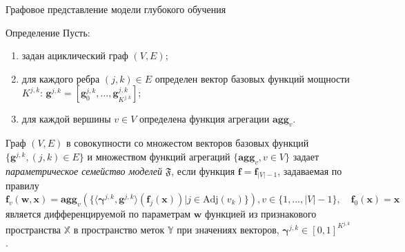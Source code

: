 \documentclass[usenames,dvipsnames,11pt,pdf,utf8,russian,aspectratio=43]{beamer}
\begin{document}
\begin{frame}{Графовое представление модели глубокого обучения}
\footnotesize
\begin{block}{Определение}
Пусть:
\begin{enumerate}
\item задан ациклический граф $(V,E)$;
\item для каждого ребра $(j,k) \in E$ определен вектор базовых функций  мощности $K^{j,k}$: $\mathbf{g}^{j,k} = [\mathbf{g}^{j,k}_0, \dots, \mathbf{g}^{j,k}_{K^{j,k}}]$;
\item для каждой вершины $v \in V$ определена функция агрегации $\textbf{agg}_v$.
\end{enumerate}
Граф $(V, E)$ в совокупности со множестом векторов базовых функций $\{\mathbf{g}^{j,k}, (j,k) \in E\}$ и множеством функций агрегаций $\{ \textbf{agg}_v, {v \in V}\}$ задает \textit{параметрическое семейство моделей} $\mathfrak{F}$, если функция $\mathbf{f} = \mathbf{f}_{|V|-1}$, задаваемая по правилу 
\begin{equation}
\label{eq:modelfam}
    \mathbf{f}_{v}(\mathbf{w}, \mathbf{x}) = \textbf{agg}_{v}\left(\{ \langle \boldsymbol{\gamma}^{j,k}, \mathbf{g}^{j,k} \rangle \left(\mathbf{f}_j(\mathbf{x})\right)| j \in \text{Adj}(v_k)\}\right), v \in \{1,\dots,|V|-1\}, \quad \mathbf{f}_0(\mathbf{x}) = \mathbf{x}
\end{equation}
является дифференцируемой  по параметрам $\mathbf{w}$ функцией из признакового пространства $\mathbb{X}$ в пространство меток $\mathbb{Y}$ при значениях векторов, $\boldsymbol{\gamma}^{j,k} \in [0,1]^{K^{j,k}}$.

\end{block}
\end{frame}

      
\end{document}
